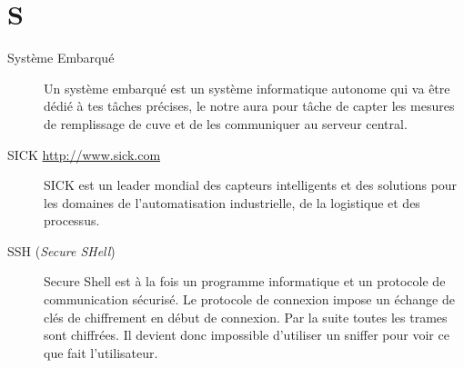 \section{S}

\begin{description}

\item[Système Embarqué] Un système embarqué est un système informatique autonome
qui va être dédié à tes tâches précises, le notre aura pour tâche de capter les 
mesures de remplissage de cuve et de les communiquer au serveur central.

\item[SICK \url{http://www.sick.com}]
SICK est un leader mondial des capteurs intelligents et des solutions pour les domaines de l’automatisation industrielle, de la logistique et des processus.

\item[SSH (\textsl{Secure SHell})]
Secure Shell est à la fois un programme informatique et un protocole de communication sécurisé. Le protocole de connexion impose un échange de clés de chiffrement en début de connexion. Par la suite toutes les trames sont chiffrées. Il devient donc impossible d'utiliser un sniffer pour voir ce que fait l'utilisateur.

\end{description}



